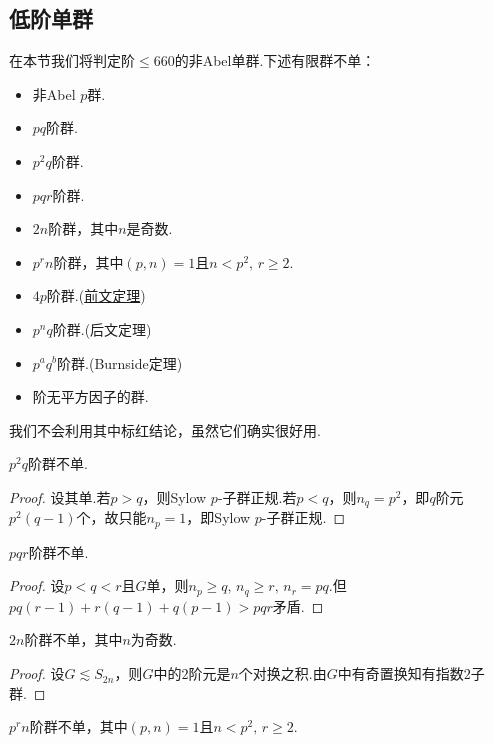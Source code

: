 \subsection{低阶单群}\label{subsec:SimpleGrpLowOrder}
在本节我们将判定阶$\le 660$的非Abel单群.下述有限群不单：
\begin{itemize}
	\item 非Abel $p$群.
	\item $pq$阶群.
	\item $p^2q$阶群.
	\item $pqr$阶群.
	\item $2n$阶群，其中$n$是奇数.
	\item $p^rn$阶群，其中$(p,n)=1$且$n<p^2,\,r\ge 2$.
	\item[{\color{red}\textbullet}] $4p$阶群.(\hyperlink{prop:4pGroupStruc}{前文定理})
	\item[{\color{red}\textbullet}] $p^nq$阶群.(后文定理)%
	\item[{\color{red}\textbullet}] $p^aq^b$阶群.(Burnside定理)
	\item[{\color{red}\textbullet}] 阶无平方因子的群.%
\end{itemize}
\begin{remark}
	我们不会利用其中标红结论，虽然它们确实很好用.
\end{remark}
\begin{lemma}
	$p^2q$阶群不单.
\end{lemma}
\begin{proof}
	设其单.若$p>q$，则Sylow $p$-子群正规.若$p<q$，则$n_q=p^2$，即$q$阶元$p^2(q-1)$个，故只能$n_p=1$，即Sylow $p$-子群正规.
\end{proof}
\begin{lemma}
	$pqr$阶群不单.
\end{lemma}
\begin{proof}
	设$p<q<r$且$G$单，则$n_p\ge q,\,n_q\ge r,\,n_r=pq$.但$pq(r-1)+r(q-1)+q(p-1)>pqr$矛盾.
\end{proof}
\begin{lemma}
	$2n$阶群不单，其中$n$为奇数.
\end{lemma}
\begin{proof}
	设$G\lesssim S_{2n}$，则$G$中的$2$阶元是$n$个对换之积.由$G$中有奇置换知有指数$2$子群.
\end{proof}
\begin{lemma*}
	$p^rn$阶群不单，其中$(p,n)=1$且$n<p^2,\,r\ge 2$.\hypertarget{lemma:p^rnNSimple}{}
\end{lemma*}
